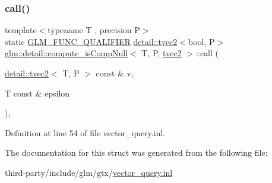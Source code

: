 \subsubsection{\texorpdfstring{call()}{call()}}
{\footnotesize\ttfamily template$<$typename T , precision P$>$ \\
static \hyperlink{setup_8hpp_a33fdea6f91c5f834105f7415e2a64407}{G\+L\+M\+\_\+\+F\+U\+N\+C\+\_\+\+Q\+U\+A\+L\+I\+F\+I\+ER} \hyperlink{structglm_1_1detail_1_1tvec2}{detail\+::tvec2}$<$bool, P$>$ \hyperlink{structglm_1_1detail_1_1compute__is_comp_null}{glm\+::detail\+::compute\+\_\+is\+Comp\+Null}$<$ T, P, \hyperlink{structglm_1_1detail_1_1tvec2}{tvec2} $>$\+::call (\begin{DoxyParamCaption}\item[{\hyperlink{structglm_1_1detail_1_1tvec2}{detail\+::tvec2}$<$ T, P $>$ const \&}]{v,  }\item[{T const \&}]{epsilon }\end{DoxyParamCaption})\hspace{0.3cm}{\ttfamily [inline]}, {\ttfamily [static]}}



Definition at line 54 of file vector\+\_\+query.\+inl.



The documentation for this struct was generated from the following file\+:\begin{DoxyCompactItemize}
\item 
third-\/party/include/glm/gtx/\hyperlink{vector__query_8inl}{vector\+\_\+query.\+inl}\end{DoxyCompactItemize}

